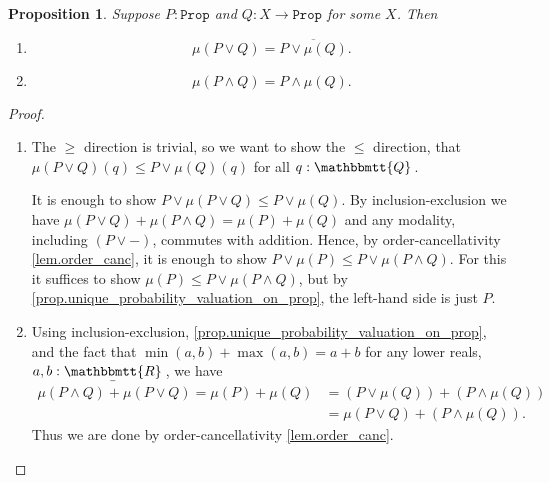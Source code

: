 \documentclass[11pt, oneside, article]{memoir}
\theoremstyle{plain}
\newtheorem{proposition}[theorem]{Proposition}
\theoremstyle{definition}
\theoremstyle{remark}
\newcommand{\const}[1]{\mathtt{#1}}
\newcommand{\ol}[1]{\overline{#1}}
\newcommand{\ubar}[1]{\underaccent{\bar}{#1}}
\newcommand{\internal}[1]{\raisebox{-.03ex}{$\mathbbmtt{#1}$}}
\newcommand{\hs}{\hspace{1.1pt}}
\newcommand{\tQQ}{\internal{Q}\hs}
\newcommand{\tRR}{\internal{R}\hs}
\newcommand{\tLR}{\ubar{\tRR}\hs}
\newcommand{\Prop}{\const{Prop}}
\begin{document}
\begin{proposition}\label{prop.valuations_OR}
Suppose $P:\Prop$ and $Q:X\to\Prop$ for some $X$. Then
\begin{enumerate}
\item \[\mu(P\vee Q)=\ol{P\vee\mu(Q)}.\]
\item \[\mu(P\wedge Q) = P \wedge \mu(Q).\]
\end{enumerate}
\end{proposition} 
\begin{proof}
\begin{enumerate}
\item The $\geq$ direction is trivial, so we want to show the $\leq$ direction, that $\mu(P\vee Q)(q)\leq P\vee\mu(Q)(q)$ for all $q:\tQQ$.

It is enough to show $P\vee\mu(P\vee Q)\leq P\vee\mu(Q)$. By inclusion-exclusion we have $\mu(P\vee Q)+\mu(P\wedge Q)=\mu(P)+\mu(Q)$ and any modality, including $(P\vee-)$, commutes with addition. Hence, by order-cancellativity \cref{lem.order_canc}, it is enough to show $P\vee\mu(P)\leq P\vee\mu(P\wedge Q)$.
For this it suffices to show $\mu(P)\leq P\vee\mu(P\wedge Q)$, but by \cref{prop.unique_probability_valuation_on_prop}, the left-hand side is just $P$.
\item Using inclusion-exclusion, \cref{prop.unique_probability_valuation_on_prop}, and the fact that $\min(a,b)+\max(a,b)=a+b$ for any lower reals, $a,b:\tLR$, we have
\begin{align*}
	\mu(P\wedge Q)+\mu(P\vee Q)=\mu(P)+\mu(Q)
	&=(P\vee\mu(Q))+(P\wedge\mu(Q))\\
	&=\mu(P\vee Q)+(P\wedge\mu(Q)).
\end{align*}
Thus we are done by order-cancellativity \cref{lem.order_canc}.
\end{enumerate}
\end{proof}
\end{document}
